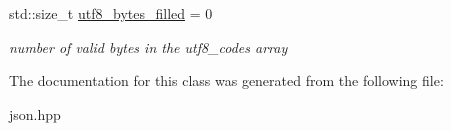 \begin{DoxyCompactItemize}
\mbox{\label{classnlohmann_1_1detail_1_1wide__string__input__adapter_a9fc33bf0974526336e53ea530c7097ff}} 
std\+::size\+\_\+t \mbox{\hyperlink{classnlohmann_1_1detail_1_1wide__string__input__adapter_a9fc33bf0974526336e53ea530c7097ff}{utf8\+\_\+bytes\+\_\+filled}} = 0
\begin{DoxyCompactList}\small\item\em number of valid bytes in the utf8\+\_\+codes array \end{DoxyCompactList}\end{DoxyCompactItemize}


The documentation for this class was generated from the following file\+:\begin{DoxyCompactItemize}
\item 
json.\+hpp\end{DoxyCompactItemize}
